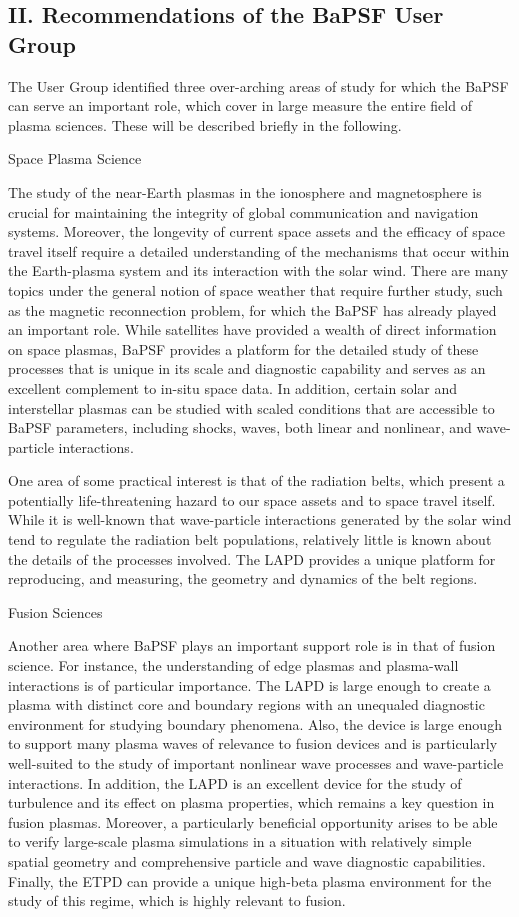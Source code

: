 \documentclass[11pt]{article}
\begin{document}
\subsection{II. Recommendations of the BaPSF User Group}

The User Group identified three over-arching areas of study for which the BaPSF can
serve an important role, which cover in large measure the entire field of plasma sciences.
These will be described briefly in the following.

Space Plasma Science

The study of the near-Earth plasmas in the ionosphere and magnetosphere is crucial for
maintaining the integrity of global communication and navigation systems. Moreover,
the longevity of current space assets and the efficacy of space travel itself require a
detailed understanding of the mechanisms that occur within the Earth-plasma system
and its interaction with the solar wind. There are many topics under the general notion
of space weather that require further study, such as the magnetic reconnection problem,
for which the BaPSF has already played an important role. While satellites have
provided a wealth of direct information on space plasmas, BaPSF provides a platform
for the detailed study of these processes that is unique in its scale and diagnostic
capability and serves as an excellent complement to in-situ space data. In addition,
certain solar and interstellar plasmas can be studied with scaled conditions that are
accessible to BaPSF parameters, including shocks, waves, both linear and nonlinear, and
wave-particle interactions.

One area of some practical interest is that of the radiation belts, which present a
potentially life-threatening hazard to our space assets and to space travel itself. While it
is well-known that wave-particle interactions generated by the solar wind tend to
regulate the radiation belt populations, relatively little is known about the details of the
processes involved. The LAPD provides a unique platform for reproducing, and
measuring, the geometry and dynamics of the belt regions.

Fusion Sciences

Another area where BaPSF plays an important support role is in that of fusion science.
For instance, the understanding of edge plasmas and plasma-wall interactions is of
particular importance. The LAPD is large enough to create a plasma with distinct core
and boundary regions with an unequaled diagnostic environment for studying boundary
phenomena. Also, the device is large enough to support many plasma waves of
relevance to fusion devices and is particularly well-suited to the study of important
nonlinear wave processes and wave-particle interactions. In addition, the LAPD is an
excellent device for the study of turbulence and its effect on plasma properties, which
remains a key question in fusion plasmas. Moreover, a particularly beneficial
opportunity arises to be able to verify large-scale plasma simulations in a situation with
relatively simple spatial geometry and comprehensive particle and wave diagnostic
capabilities. Finally, the ETPD can provide a unique high-beta plasma environment for
the study of this regime, which is highly relevant to fusion.
\end{document}
